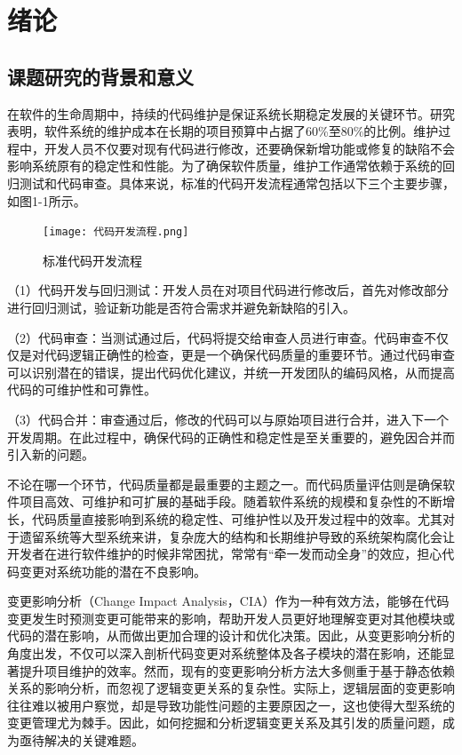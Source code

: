 
\chapter{绪论}

\section{课题研究的背景和意义}

在软件的生命周期中，持续的代码维护是保证系统长期稳定发展的关键环节。研究表明，软件系统的维护成本在长期的项目预算中占据了60\%至80\%的比例\cite{2012Maintenance}。维护过程中，开发人员不仅要对现有代码进行修改，还要确保新增功能或修复的缺陷不会影响系统原有的稳定性和性能。为了确保软件质量，维护工作通常依赖于系统的回归测试和代码审查。具体来说，标准的代码开发流程通常包括以下三个主要步骤，如图1-1所示。

\begin{figure}[h]
\centering
\texttt{[image: 代码开发流程.png]}
\caption{标准代码开发流程}
\end{figure}

（1）代码开发与回归测试：开发人员在对项目代码进行修改后，首先对修改部分进行回归测试，验证新功能是否符合需求并避免新缺陷的引入。

（2）代码审查：当测试通过后，代码将提交给审查人员进行审查。代码审查不仅仅是对代码逻辑正确性的检查，更是一个确保代码质量的重要环节。通过代码审查可以识别潜在的错误，提出代码优化建议，并统一开发团队的编码风格，从而提高代码的可维护性和可靠性。

（3）代码合并：审查通过后，修改的代码可以与原始项目进行合并，进入下一个开发周期。在此过程中，确保代码的正确性和稳定性是至关重要的，避免因合并而引入新的问题。

不论在哪一个环节，代码质量都是最重要的主题之一。而代码质量评估则是确保软件项目高效、可维护和可扩展的基础手段。随着软件系统的规模和复杂性的不断增长，代码质量直接影响到系统的稳定性、可维护性以及开发过程中的效率。尤其对于遗留系统等大型系统来讲，复杂庞大的结构和长期维护导致的系统架构腐化会让开发者在进行软件维护的时候非常困扰，常常有“牵一发而动全身”的效应，担心代码变更对系统功能的潜在不良影响。

变更影响分析（Change Impact Analysis，CIA）作为一种有效方法，能够在代码变更发生时预测变更可能带来的影响，帮助开发人员更好地理解变更对其他模块或代码的潜在影响，从而做出更加合理的设计和优化决策。因此，从变更影响分析的角度出发，不仅可以深入剖析代码变更对系统整体及各子模块的潜在影响，还能显著提升项目维护的效率\cite{2022An}。然而，现有的变更影响分析方法大多侧重于基于静态依赖关系的影响分析，而忽视了逻辑变更关系的复杂性。实际上，逻辑层面的变更影响往往难以被用户察觉，却是导致功能性问题的主要原因之一，这也使得大型系统的变更管理尤为棘手。因此，如何挖掘和分析逻辑变更关系及其引发的质量问题，成为亟待解决的关键难题。

